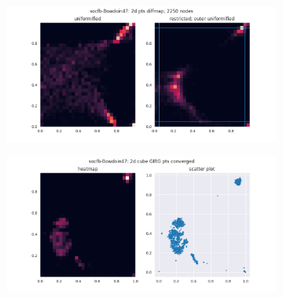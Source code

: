 \begin{figure}
  \begin{subfigure}{\textwidth}
    \centering
    \includegraphics[width=\linewidth]{figures/socfb-Bowdoin47_2ddiffmap_unif_vs_restrict.png}
  \end{subfigure}

  \vspace{1em}
  \begin{subfigure}{\textwidth}
    \centering
    \includegraphics[width=\linewidth]{figures/socfb-Bowdoin47_2d_cube_GIRG_converged.png}
  \end{subfigure}

\end{figure}

